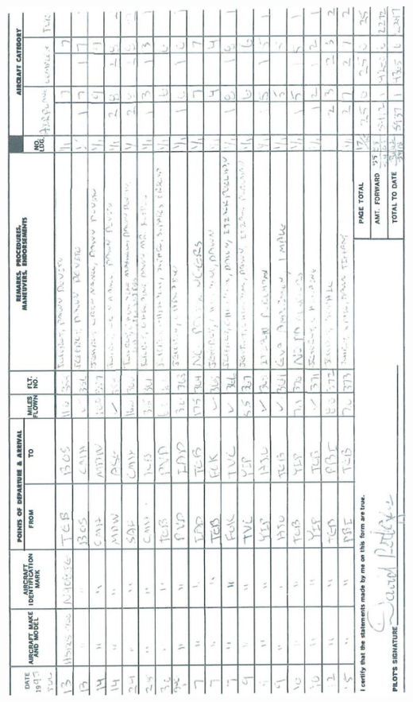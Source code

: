 \documentclass[10pt]{article}
\begin{document}
\includegraphics[max width=\textwidth, center]{2025_02_27_dd68c3d38de88f0516d9g-025}\\
\end{document}
